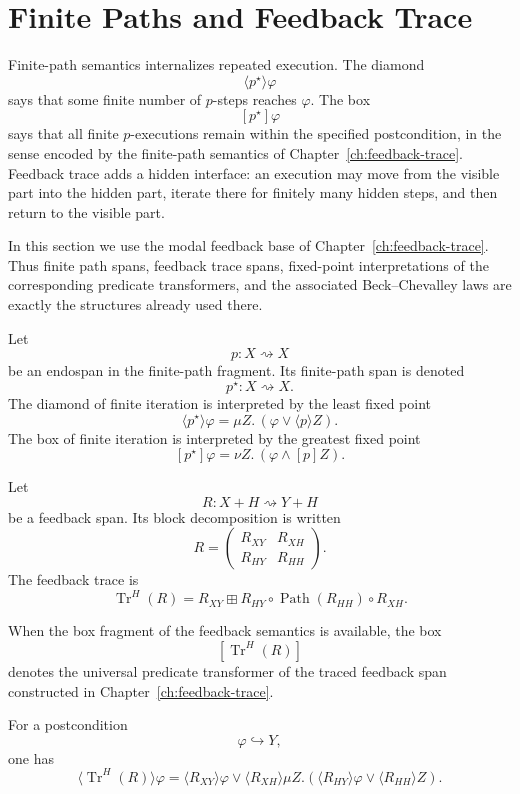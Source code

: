 \section{Finite Paths and Feedback Trace}
\label{sec:finite-paths-feedback-trace-formal}

Finite-path semantics internalizes repeated execution.  The diamond
\[
  \langle p^\star\rangle\varphi
\]
says that some finite number of \(p\)-steps reaches \(\varphi\).  The box
\[
  [p^\star]\varphi
\]
says that all finite \(p\)-executions remain within the specified
postcondition, in the sense encoded by the finite-path semantics of
Chapter~\ref{ch:feedback-trace}.  Feedback trace
adds a hidden interface: an execution may move from the visible part into the
hidden part, iterate there for finitely many hidden steps, and then return to
the visible part.

In this section we use the modal feedback base of
Chapter~\ref{ch:feedback-trace}.  Thus finite path
spans, feedback trace spans, fixed-point interpretations of the corresponding
predicate transformers, and the associated Beck--Chevalley laws are exactly
the structures already used there.

Let
\[
  p:X\rightsquigarrow X
\]
be an endospan in the finite-path fragment.  Its finite-path span is denoted
\[
  p^\star:X\rightsquigarrow X.
\]
The diamond of finite iteration is interpreted by the least fixed point
\[
  \langle p^\star\rangle\varphi
  =
  \mu Z.\,(\varphi\vee \langle p\rangle Z).
\]
The box of finite iteration is interpreted by the greatest fixed point
\[
  [p^\star]\varphi
  =
  \nu Z.\,(\varphi\wedge [p]Z).
\]

Let
\[
  R:X+H\rightsquigarrow Y+H
\]
be a feedback span.  Its block decomposition is written
\[
  R=
  \begin{pmatrix}
    R_{XY} & R_{XH}\\
    R_{HY} & R_{HH}
  \end{pmatrix}.
\]
The feedback trace is
\[
  \operatorname{Tr}^H(R)
  =
  R_{XY}
  \boxplus
  R_{HY}\circ \operatorname{Path}(R_{HH})\circ R_{XH}.
\]

When the box fragment of the feedback semantics is available, the box
\[
  [\operatorname{Tr}^H(R)]
\]
denotes the universal predicate transformer of the traced feedback span
constructed in
Chapter~\ref{ch:feedback-trace}.

\begin{proposition}
\label{prop:trace-diamond}
For a postcondition
\[
  \varphi\hookrightarrow Y,
\]
one has
\[
  \langle\operatorname{Tr}^H(R)\rangle\varphi
  =
  \langle R_{XY}\rangle\varphi
  \vee
  \langle R_{XH}\rangle
  \mu Z.
  \left(
    \langle R_{HY}\rangle\varphi
    \vee
    \langle R_{HH}\rangle Z
  \right).
\]
\end{proposition}

